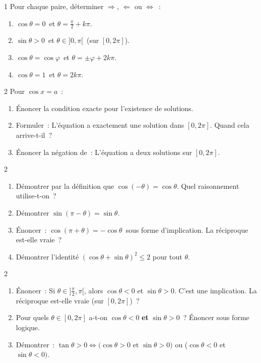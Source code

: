 \begin{bilan}
\begin{exo}{1}
Pour chaque paire, d\'eterminer $\Rightarrow$, $\Leftarrow$ ou $\Leftrightarrow$~:
\begin{enumerate}
  \item \og $\cos\theta=0$\fg\ et \og $\theta=\frac{\pi}{2}+k\pi$\fg.
  \item \og $\sin\theta>0$\fg\ et \og $\theta\in]0,\pi[$\fg\ (sur $[0,2\pi]$).
  \item \og $\cos\theta=\cos\varphi$\fg\ et \og $\theta=\pm\varphi+2k\pi$\fg.
  \item \og $\cos\theta=1$\fg\ et \og $\theta=2k\pi$\fg.
\end{enumerate}
\end{exo}

\begin{exo}{2}
Pour $\cos x = a$~:
\begin{enumerate}
  \item \'Enoncer la condition exacte pour l'existence de solutions.
  \item Formuler~: \og L'\'equation a exactement une solution dans $[0,2\pi]$\fg.
        Quand cela arrive-t-il~?
  \item \'Enoncer la n\'egation de~: \og L'\'equation a deux solutions sur $[0,2\pi]$\fg.
\end{enumerate}
\end{exo}

\begin{exo}{2}
\begin{enumerate}
  \item D\'emontrer par la d\'efinition que $\cos(-\theta)=\cos\theta$.
        Quel raisonnement utilise-t-on~?
  \item D\'emontrer $\sin(\pi-\theta)=\sin\theta$.
  \item \'Enoncer~: \og $\cos(\pi+\theta)=-\cos\theta$\fg\ sous forme d'implication.
        La r\'eciproque est-elle vraie~?
  \item D\'emontrer l'identit\'e $(\cos\theta+\sin\theta)^2\leq2$ pour tout $\theta$.
\end{enumerate}
\end{exo}

\begin{exo}{2}
\begin{enumerate}
  \item \'Enoncer~: \og Si $\theta\in]\frac{\pi}{2},\pi[$, alors $\cos\theta<0$ et $\sin\theta>0$.\fg
        C'est une implication. La r\'eciproque est-elle vraie (sur $[0,2\pi]$)~?
  \item Pour quels $\theta\in[0,2\pi]$ a-t-on $\cos\theta<0$ \textbf{et} $\sin\theta>0$~?
        \'Enoncer sous forme logique.
  \item D\'emontrer~: $\tan\theta>0 \Leftrightarrow (\cos\theta>0$ et $\sin\theta>0)$
        ou ($\cos\theta<0$ et $\sin\theta<0)$.
\end{enumerate}
\end{exo}


\end{bilan}
